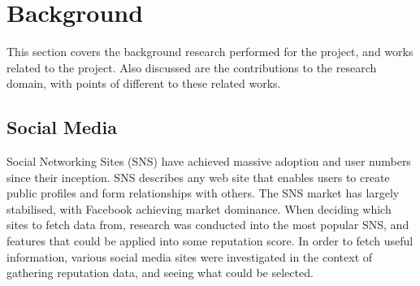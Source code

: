 \chapter{Background}\label{C:us}







This section covers the background research performed for the project, and works related to the project. Also discussed are the contributions to the research domain, with points of different to these related works.


\section{Social Media}

Social Networking Sites (SNS) have achieved massive adoption and user numbers since their inception. SNS describes any web site that enables users to create public profiles and form relationships with others. The SNS market has largely stabilised, with Facebook achieving market dominance. When deciding which sites to fetch data from, research was conducted into the most popular SNS, and features that could be applied into some reputation score. In order to fetch useful information, various social media sites were investigated in the context of gathering reputation data, and seeing what could be selected.




